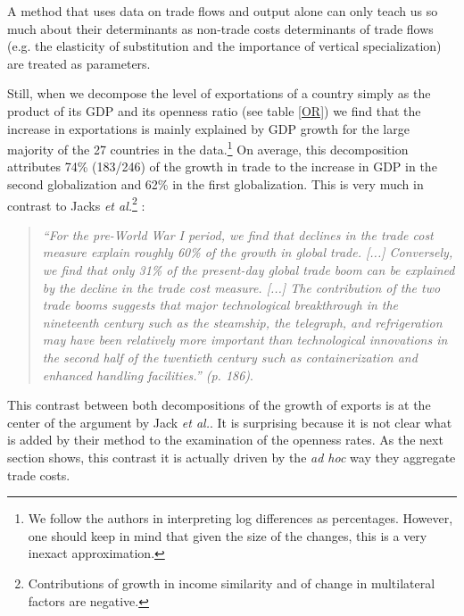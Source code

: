 \documentclass{article}
\begin{document}
A method that uses data on trade flows and output alone can only teach us so much about their determinants as non-trade costs determinants of trade flows (e.g. the elasticity of substitution and the importance of vertical specialization) are treated as parameters.

Still, when we decompose the level of exportations of a country simply as the product of its GDP and its openness ratio (see table \ref{OR}) we find that the increase in exportations is mainly explained by GDP growth for the large majority of the 27 countries in the data.\footnote{We follow the authors in interpreting log differences as percentages. However, one should keep in mind that given the size of the changes, this is a very inexact approximation.}
On average, this decomposition attributes 74\% (183/246) of the growth in trade to the increase in GDP in the second globalization and 62\% in the first globalization.
This is very much in contrast to  Jacks \textit{et al.}\footnote{Contributions of growth in income similarity and of change in multilateral factors are negative.} :
 
\begin{quote}
\emph{``For the pre-World War I period, we find that declines in the trade cost measure explain roughly 60\% of the growth in global trade. [...] Conversely, we find that only 31\% of the present-day global trade boom can be explained by the decline in the trade cost measure. [...] The contribution of the two trade booms suggests that major technological breakthrough in the nineteenth century such as the steamship, the telegraph, and refrigeration may have been relatively more important than technological innovations in the second half of the twentieth century such as containerization and enhanced handling facilities.'' (p. 186)}.
\end{quote}

This contrast between both decompositions of the growth of exports is at the center of the argument by Jack \textit{et al.}.
It is surprising because it is not clear what is added by their method to the examination of the openness rates.
As the next section shows, this contrast it is actually driven by the \textit{ad hoc} way they aggregate trade costs.
\end{document}
